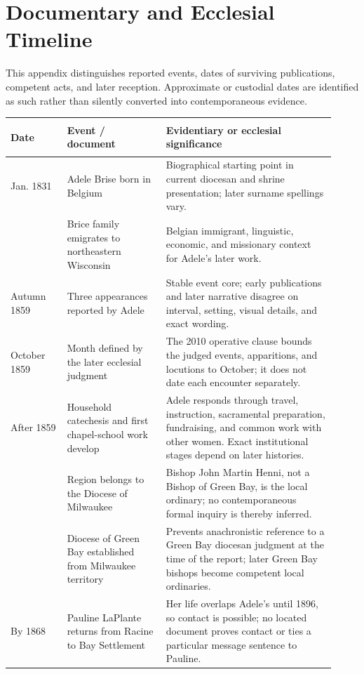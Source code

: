 \section{Documentary and Ecclesial Timeline}

This appendix distinguishes reported events, dates of surviving publications, competent acts, and later reception. Approximate or custodial dates are identified as such rather than silently converted into contemporaneous evidence.

\begingroup
\footnotesize
\setlength{\LTpre}{0pt}
\begin{longtable}{>{\bfseries\raggedright\arraybackslash}p{0.16\linewidth}>{\raggedright\arraybackslash}p{0.28\linewidth}>{\raggedright\arraybackslash}p{0.48\linewidth}}
\toprule
Date & Event / document & Evidentiary or ecclesial significance\\
\midrule
\endhead
30 Jan. 1831 & Adele Brise born in Belgium & Biographical starting point in current diocesan and shrine presentation; later surname spellings vary.\\
1855 & Brice family emigrates to northeastern Wisconsin & Belgian immigrant, linguistic, economic, and missionary context for Adele's later work.\\
Autumn 1859 & Three appearances reported by Adele & Stable event core; early publications and later narrative disagree on interval, setting, visual details, and exact wording.\\
October 1859 & Month defined by the later ecclesial judgment & The 2010 operative clause bounds the judged events, apparitions, and locutions to October; it does not date each encounter separately.\\
After 1859 & Household catechesis and first chapel-school work develop & Adele responds through travel, instruction, sacramental preparation, fundraising, and common work with other women. Exact institutional stages depend on later histories.\\
1859 & Region belongs to the Diocese of Milwaukee & Bishop John Martin Henni, not a Bishop of Green Bay, is the local ordinary; no contemporaneous formal inquiry is thereby inferred.\\
1868 & Diocese of Green Bay established from Milwaukee territory & Prevents anachronistic reference to a Green Bay diocesan judgment at the time of the report; later Green Bay bishops become competent local ordinaries.\\
By 1868 & Pauline LaPlante returns from Racine to Bay Settlement & Her life overlaps Adele's until 1896, so contact is possible; no located document proves contact or ties a particular message sentence to Pauline.\\

\end{longtable}
